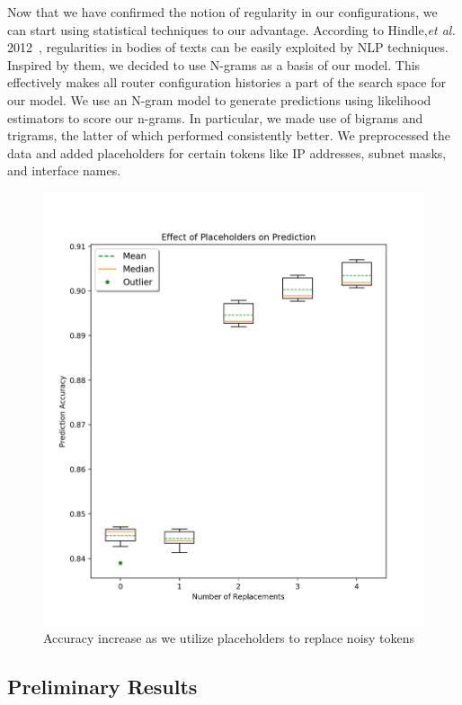 Now that we have confirmed the notion of regularity in our configurations, we can start using statistical techniques to our advantage. According to Hindle,\textit{et al.} 2012~\cite{naturalness}, regularities in bodies of texts can be easily exploited by NLP techniques. Inspired by them, we decided to use N-grams as a basis of our model. This effectively makes all router configuration histories a part of the search space for our model. We use an N-gram model to generate predictions using likelihood estimators to score our n-grams. In particular, we made use of bigrams and trigrams, the latter of which performed consistently better. We preprocessed the data and added placeholders for certain tokens like IP addresses, subnet masks, and interface names.\\
\begin{figure}
	\centering
	\includegraphics[width=\columnwidth]{replacement_analysis.png}
	\caption{Accuracy increase as we utilize placeholders to replace noisy tokens}
    \label{fig:replacement_analysis}
\end{figure}

\subsection{Preliminary Results}

